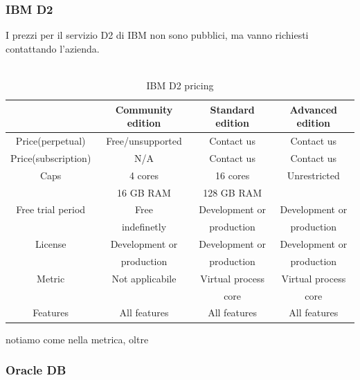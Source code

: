 \documentclass{article}
\begin{document}
\subsubsection{IBM D2}
I prezzi per il servizio D2 di IBM non sono pubblici, ma vanno richiesti contattando l'azienda.\\\\
\begin{table}
\begin{tabular}{ | c c c c | }
\hline
 & Community edition & Standard edition & Advanced edition\\
\hline 
Price(perpetual) & Free/unsupported & Contact us & Contact us\\
\hline
Price(subscription) & N/A & Contact us & Contact us\\
\hline
Caps & 4 cores & 16 cores & Unrestricted\\
 & 16 GB RAM & 128 GB RAM &  \\
\hline
Free trial period & Free & Development or & Development or\\
 & indefinetly & production & production\\
\hline
License & Development or & Development or & Development or\\
 & production & production & production\\
\hline
Metric & Not applicabile & Virtual process & Virtual process\\
 & & core & core\\
\hline
Features & All features & All features & All features\\
\hline
\end{tabular}
\caption{IBM D2 pricing}
\end{table}
\FloatBarrier
notiamo come nella metrica, oltre 
\subsubsection{Oracle DB}
\end{document}
